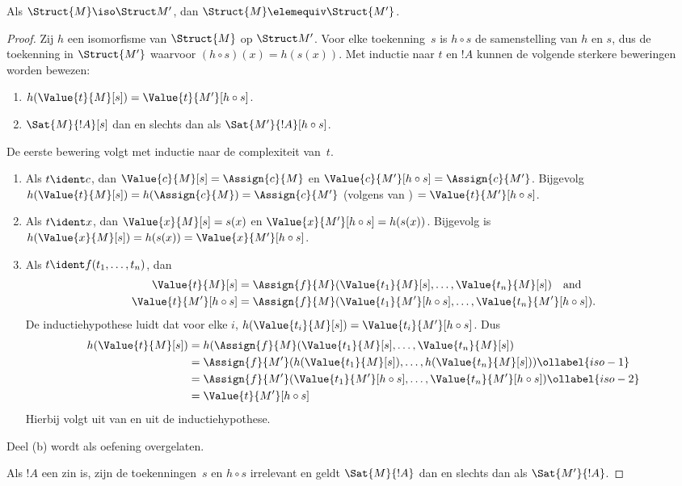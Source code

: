 \documentclass[../../../include/open-logic-section]{subfiles}
\begin{document}
\begin{thm}
Als $\Struct{M} \iso \Struct M'$, dan $\Struct{M} \elemequiv
\Struct{M'}$.
\end{thm}

\begin{proof}
Zij $h$ een isomorfisme van $\Struct{M}$ op $\Struct M'$. Voor elke
toekenning~$s$ is $h \circ s$ de samenstelling van $h$ en $s$, dus de
toekenning in $\Struct{M'}$ waarvoor $(h \circ s)(x) = h(s(x))$.
Met inductie naar $t$ en $!A$ kunnen de volgende sterkere beweringen
worden bewezen:
\begin{enumerate}
  \item[a.] $h(\Value{t}{M}[s]) = \Value{t}{M'}[h\circ s]$.
  \item[b.] $\Sat{M}{!A}[s]$ dan en slechts dan als $\Sat{M'}{!A}[h \circ s]$.
\end{enumerate}
De eerste bewering volgt met inductie naar de complexiteit van~$t$.
\begin{enumerate}
\item Als $t \ident c$, dan $\Value{c}{M}[s] = \Assign{c}{M}$ en
  $\Value{c}{M'}[h \circ s] = \Assign{c}{M'}$. Bijgevolg
  $h(\Value{t}{M}[s]) = h(\Assign{c}{M}) = \Assign{c}{M'}$ (volgens
   van ) $=
  \Value{t}{M'}[h \circ s]$.
\item Als $t \ident x$, dan $\Value{x}{M}[s] = s(x)$ en
  $\Value{x}{M'}[h \circ s] = h(s(x))$. Bijgevolg is $h(\Value{x}{M}[s]) =
  h(s(x)) = \Value{x}{M'}[h \circ s]$.
\item Als $t \ident f(t_1, \dots, t_n)$, dan
  \begin{align*}
    \Value{t}{M}[s] & = \Assign{f}{M}(\Value{t_1}{M}[s], \dots, \Value{t_n}{M}[s]) \quad\text{and}\\
  \Value{t}{M'}[h \circ s] & = \Assign{f}{M}(\Value{t_1}{M'}[h \circ
    s], \dots, \Value{t_n}{M'}[h \circ s]).
  \end{align*}
  De inductiehypothese luidt dat voor elke $i$, $h(\Value{t_i}{M}[s])
  = \Value{t_i}{M'}[h\circ s]$. Dus
  \begin{align}
    h(\Value{t}{M}[s]) 
    & = h(\Assign{f}{M}(\Value{t_1}{M}[s], \dots, \Value{t_n}{M}[s]) \notag\\
    & = \Assign{f}{M'}(h(\Value{t_1}{M}[s]), \dots,
    h(\Value{t_n}{M}[s])) \ollabel{iso-1}\\
    & = \Assign{f}{M'}(\Value{t_1}{M'}[h \circ s], \dots,
    \Value{t_n}{M'}[h \circ s]) \ollabel{iso-2}\\
    & = \Value{t}{M'}[h\circ s] \notag
  \end{align}
  Hierbij volgt  uit  van
   en  uit de inductiehypothese.
\end{enumerate}
Deel (b) wordt als oefening overgelaten.

Als $!A$ een zin is, zijn de toekenningen~$s$ en $h \circ s$
irrelevant en geldt $\Sat{M}{!A}$ dan en slechts dan als $\Sat{M'}{!A}$.
\end{proof}
\end{document}
